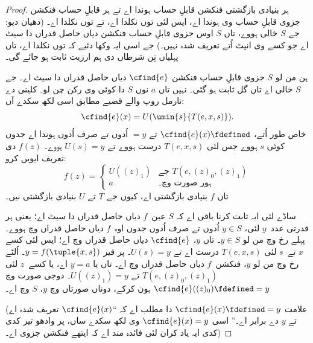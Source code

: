 \documentclass[../../../include/open-logic-section]{subfiles}
\begin{document}
\begin{proof}
ہر بنیادی بازگشتی فنکشن قابلِ حساب ہوندا اے تے ہر
قابلِ حساب فنکشن جزوی قابلِ حساب وی ہوندا اے، ایس
لئی  توں 
نکلدا اے، تے  توں
 نکلدا اے۔ (دھیان دیو: جے $S$
خالی ہووے، تاں $S$ اوس جزوی قابلِ حساب فنکشن
دیاں حاصل قدراں دا سیٹ اے جو کسے وی انپٹ اُتے
تعریف شدہ نہیں۔) جے اسی ایہ وکھا دئیے کہ
 توں 
نکلدا اے، تاں پہلیاں تِن شرطاں دی ہم ارزیت ثابت
ہو جائے گی۔

ہن من لو $S$ جزوی قابلِ حساب فنکشن
$\cfind{e}$ دیاں حاصل قدراں دا سیٹ اے۔ جے $S$
خالی اے تاں گل ثابت ہو گئی۔ نہیں تاں $a$ نوں
$S$ دا کوئی وی رکن چن لو۔ کلینی دے نارمل روپ
والے قضیے مطابق اسی لکھ سکدے آں:
\[
\cfind{e}(x) = U(\umin{s}{T(e, x, s)}).
\]
خاص طور اُتے، $\cfind{e}(x) \fdefined$ تے $= y$
اُدوں تے صرف اُدوں ہوندا اے جدوں کوئی $s$ ہووے
جس لئی $T(e, x, s)$ درست ہووے تے $U(s) = y$
ہووے۔ $f(z)$ دی تعریف ایویں کرو:
\[
f(z) = \begin{cases}
  U((z)_1) & \text{جے $T(e, (z)_0, (z)_1)$} \\
  a        & \text{ہور صورت وچ۔}
\end{cases}
\]
تاں $f$ بنیادی بازگشتی اے، کیوں جے $T$ تے $U$
بنیادی بازگشتی نیں۔ 

ساڈے لئی ایہ ثابت کرنا باقی اے کہ $S$ عین~$f$
دیاں حاصل قدراں دا سیٹ اے؛ یعنی ہر قدرتی
عدد~$y$ لئی، $y \in S$ اُدوں تے صرف اُدوں
جدوں اوہ~$f$ دیاں حاصل قدراں وچ ہووے۔ پہلے
رخ وچ من لو $y \in S$۔ تاں $y$،
$\cfind{e}$ دیاں حاصل قدراں وچ اے؛ ایس لئی
کسے $x$ تے~$s$ لئی $T(e,x,s)$ درست اے
تے $U(s) = y$۔ پر فیر $y = f(\tuple{x,s})$۔
اُلٹے رخ وچ من لو $y$، فنکشن~$f$ دیاں
حاصل قدراں وچ اے۔ تاں یا $y = a$ اے،
یا کسے~$z$ لئی $T(e,(z)_0,(z)_1)$ تے
$U((z)_1) = y$۔ %
دوجی صورت وچ $\cfind{e}((z)_0) \fdefined =
y$ ہون کرکے، دوناں صورتاں وچ $y$،
$S$ وچ اے۔

(علامت $\cfind{e}(x) \fdefined = y$ دا مطلب
اے کہ ``$\cfind{e}(x)$ تعریف شدہ اے تے
$y$ دے برابر اے۔'' اسی $\cfind{e}(x) =
y$ وی لکھ سکدے ساں، پر وادھو تیر کدی کدی
ایہ یاد کران لئی فائدہ مند اے کہ ایتھے فنکشن
جزوی اے۔)


\end{proof}
\end{document}
